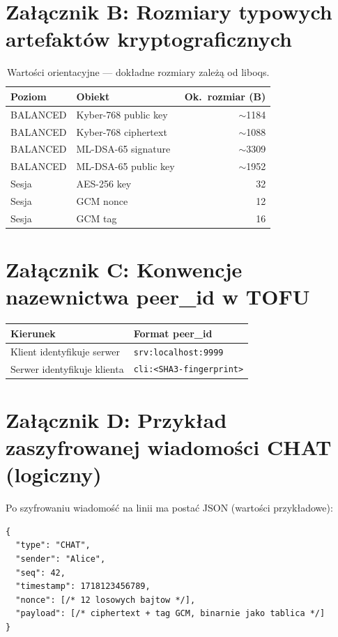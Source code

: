 \documentclass[12pt,a4paper]{article}
\begin{document}
\section{Załącznik B: Rozmiary typowych artefaktów kryptograficznych}

\begin{table}[H]
\centering
\small
\begin{tabular}{@{}llr@{}}
\toprule
\textbf{Poziom} & \textbf{Obiekt} & \textbf{Ok.\ rozmiar (B)} \\
\midrule
BALANCED & Kyber-768 public key & $\sim$1184 \\
BALANCED & Kyber-768 ciphertext & $\sim$1088 \\
BALANCED & ML-DSA-65 signature & $\sim$3309 \\
BALANCED & ML-DSA-65 public key & $\sim$1952 \\
\midrule
Sesja & AES-256 key & 32 \\
Sesja & GCM nonce & 12 \\
Sesja & GCM tag & 16 \\
\bottomrule
\end{tabular}
\caption{Wartości orientacyjne --- dokładne rozmiary zależą od liboqs.}
\end{table}

\section{Załącznik C: Konwencje nazewnictwa peer\_id w TOFU}

\begin{table}[H]
\centering
\begin{tabular}{@{}ll@{}}
\toprule
\textbf{Kierunek} & \textbf{Format peer\_id} \\
\midrule
Klient identyfikuje serwer & \texttt{srv:localhost:9999} \\
Serwer identyfikuje klienta & \texttt{cli:<SHA3-fingerprint>} \\
\bottomrule
\end{tabular}
\end{table}

\section{Załącznik D: Przykład zaszyfrowanej wiadomości CHAT (logiczny)}

Po szyfrowaniu wiadomość na linii ma postać JSON (wartości przykładowe):

\begin{lstlisting}[style=json]
{
  "type": "CHAT",
  "sender": "Alice",
  "seq": 42,
  "timestamp": 1718123456789,
  "nonce": [/* 12 losowych bajtow */],
  "payload": [/* ciphertext + tag GCM, binarnie jako tablica */]
}
\end{lstlisting}
\end{document}
